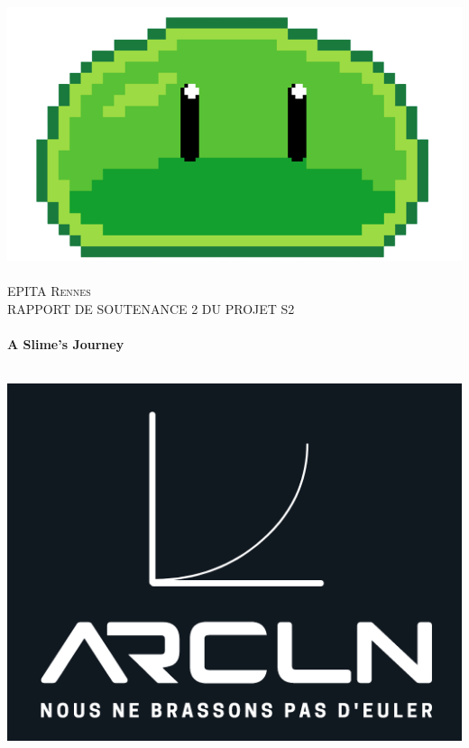 
\begin{titlepage}
    \begin{sffamily}
    \begin{center}
  
    
      \includegraphics[scale=0.3]{logo}~\\[1.5cm]
  
      \textsc{\LARGE EPITA Rennes}\\[0.5cm]
  
      \textsc{\Large RAPPORT DE SOUTENANCE 2 DU PROJET S2}\\[1.5cm]
  
      \HRule \\[0.4cm]
       { \huge \bfseries  A Slime's Journey \\[0.4cm] }
  
      \HRule \\[2cm]
      \includegraphics[scale=0.4]{arcln}
       \\[0.5cm]
  

\end{center}
\end{sffamily}
\end{titlepage}
